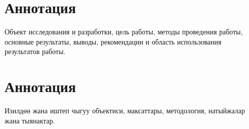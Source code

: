\section*{Аннотация}
Объект исследования и разработки, цель работы, методы проведения работы, основные результаты, выводы, рекомендации и область использования результатов работы.

\section*{Аннотация}
Изилдөө жана иштеп чыгуу объектиси, максаттары, методология, натыйжалар жана тыянактар.

\newpage
